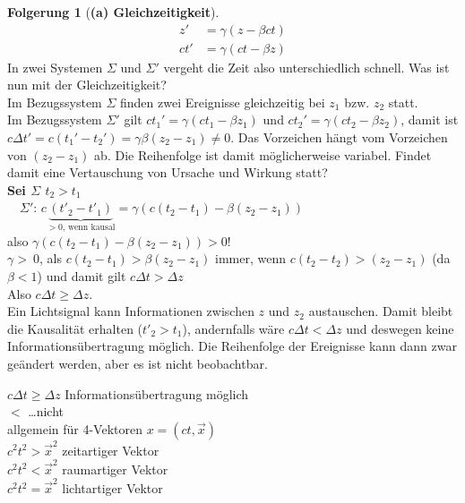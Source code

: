 \documentclass[oneside]{book}
\theoremstyle{definition}
\newtheorem*{folgerung*}{Folgerung}
\begin{document}
\begin{folgerung*}[\textbf{(a) Gleichzeitigkeit}]
	\begin{align*}
		z'  &= \gamma (z - \beta c t)\\
		ct' &= \gamma (ct - \beta z)
	\end{align*}
	In zwei Systemen $\Sigma$ und $\Sigma'$ vergeht die Zeit also unterschiedlich schnell. Was ist nun mit der Gleichzeitigkeit?\\
	Im Bezugssystem $\Sigma$ finden zwei Ereignisse gleichzeitig bei $z_1$ bzw. $z_2$ statt.\\
	Im Bezugssystem $\Sigma'$ gilt $ct_1' = \gamma (ct_1 - \beta z_1)$ und $ct_2' = \gamma (ct_2 - \beta z_2)$, damit ist $c \Delta t' = c(t_1'- t_2') = \gamma\beta (z_2 - z_1) \neq 0$.
	Das Vorzeichen hängt vom Vorzeichen von $(z_2 - z_1)$ ab. Die Reihenfolge ist damit möglicherweise variabel. Findet damit eine	Vertauschung von Ursache und Wirkung statt?\\
	\textbf{Sei $\Sigma$ $t_2 > t_1$}\\
	~~$\Sigma'$: $c\underbrace{(t'_2 - t'_1)}_{> 0 \text{, wenn kausal}} = \gamma (c (t_2 - t_1) - \beta (z_2 - z_1))$\\
	also $\gamma (c (t_2 - t_1) - \beta (z_2 - z_1)) > 0!$\\
		$\gamma >~0$, als $c (t_2 - t_1) > \beta (z_2 - z_1)$ immer, wenn $c(t_2 - t_2) > (z_2 - z_1)$ (da $\beta < 1$) und damit gilt $c \Delta t > \Delta z$\\
	Also $c \Delta t \geq \Delta z$.\\
		Ein Lichtsignal kann Informationen zwischen $z$ und $z_2$ austauschen. Damit bleibt die Kausalität erhalten ($t'_2 > t_1$), andernfalls wäre $c \Delta t < \Delta z$ und deswegen keine Informationsübertragung möglich. Die Reihenfolge der Ereignisse kann dann zwar geändert werden, aber es ist nicht beobachtbar.
\end{folgerung*}

$c \Delta t \geq \Delta z$ Informationsübertragung möglich\\
$<$ \dots nicht\\

allgemein für 4-Vektoren $x = (ct, \vec{x})$\\
$c^2 t^2 > \vec{x}^2$ zeitartiger Vektor\\
$c^2 t^2 < \vec{x}^2$ raumartiger Vektor\\
$c^2 t^2 = \vec{x}^2$ lichtartiger Vektor\\
\end{document}

